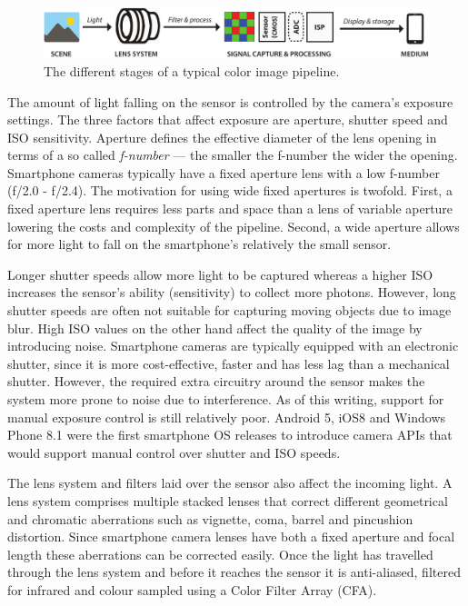\documentclass[thesis.tex]{subfiles}
\begin{document}
\begin{figure}[h]
\centering \includegraphics[width=\textwidth]{images/pipeline}
\caption{The different stages of a typical color image pipeline.\label{figure:pipeline}}
\end{figure}

The amount of light falling on the sensor is controlled by the camera's exposure settings. The three factors that affect exposure are aperture, shutter speed and ISO sensitivity. Aperture defines the effective diameter of the lens opening in terms of a so called \textit{f-number} --- the smaller the f-number the wider the opening. Smartphone cameras typically have a fixed aperture lens with a low f-number (f/2.0 - f/2.4). The motivation for using wide fixed apertures is twofold. First, a fixed aperture lens requires less parts and space than a lens of variable aperture lowering the costs and complexity of the pipeline. Second, a wide aperture allows for more light to fall on the smartphone's relatively the small sensor.

Longer shutter speeds allow more light to be captured whereas a higher ISO increases the sensor's ability (sensitivity) to collect more photons. However, long shutter speeds are often not suitable for capturing moving objects due to image blur. High ISO values on the other hand affect the quality of the image by introducing noise. Smartphone cameras are typically equipped with an electronic shutter, since it is more cost-effective, faster and has less lag than a mechanical shutter. However, the required extra circuitry around the sensor makes the system more prone to noise due to interference. As of this writing, support for manual exposure control is still relatively poor. Android 5, iOS8 and Windows Phone 8.1 were the first smartphone OS releases to introduce camera APIs that would support manual control over shutter and ISO speeds.

The lens system and filters laid over the sensor also affect the incoming light. A lens system comprises multiple stacked lenses that correct different geometrical and chromatic aberrations such as vignette, coma, barrel and pincushion distortion. Since smartphone camera lenses have both a fixed aperture and focal length these aberrations can be corrected easily. Once the light has travelled through the lens system and before it reaches the sensor it is anti-aliased, filtered for infrared and colour sampled using a Color Filter Array (CFA). \cite{color_pipeline}
\end{document}

